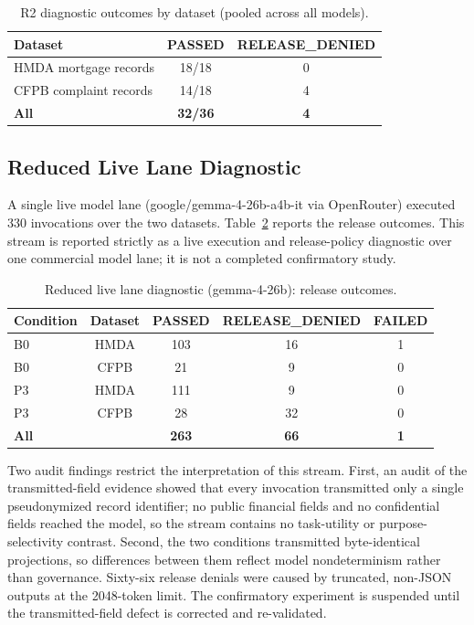 \begin{table}[t]
\centering
\caption{R2 diagnostic outcomes by dataset (pooled across all models).}
\label{tab:r2_by_dataset}
\small
\begin{tabular}{lcc}
\toprule
Dataset & PASSED & RELEASE\_DENIED \\
\midrule
HMDA mortgage records & 18/18 & 0 \\
CFPB complaint records & 14/18 & 4 \\
\midrule
\textbf{All} & \textbf{32/36} & \textbf{4} \\
\bottomrule
\end{tabular}
\end{table}

\subsection{Reduced Live Lane Diagnostic}

A single live model lane (google/gemma-4-26b-a4b-it via OpenRouter) executed
330 invocations over the two datasets.
Table~\ref{tab:reduced_scope} reports the release outcomes. This stream is
reported strictly as a live execution and release-policy diagnostic over one
commercial model lane; it is not a completed confirmatory study.

\begin{table}[t]
\centering
\caption{Reduced live lane diagnostic (gemma-4-26b): release outcomes.}
\label{tab:reduced_scope}
\small
\begin{tabular}{lcccc}
\toprule
Condition & Dataset & PASSED & RELEASE\_DENIED & FAILED \\
\midrule
B0 & HMDA & 103 & 16 & 1 \\
B0 & CFPB & 21 & 9 & 0 \\
P3 & HMDA & 111 & 9 & 0 \\
P3 & CFPB & 28 & 32 & 0 \\
\midrule
\textbf{All} & & \textbf{263} & \textbf{66} & \textbf{1} \\
\bottomrule
\end{tabular}
\end{table}

Two audit findings restrict the interpretation of this stream. First, an
audit of the transmitted-field evidence showed that every invocation
transmitted only a single pseudonymized record identifier; no public
financial fields and no confidential fields reached the model, so the stream
contains no task-utility or purpose-selectivity contrast. Second, the two
conditions transmitted byte-identical projections, so differences between
them reflect model nondeterminism rather than governance. Sixty-six release
denials were caused by truncated, non-JSON outputs at the 2048-token limit.
The confirmatory experiment is suspended until the transmitted-field defect
is corrected and re-validated.

